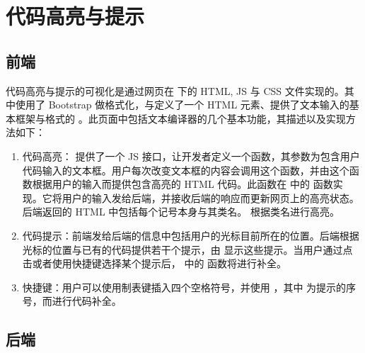 \section{代码高亮与提示}

\subsection{前端}

代码高亮与提示的可视化是通过网页在  下的 HTML, JS 与 CSS 文件实现的。其中使用了 Bootstrap 做格式化，与定义了一个 HTML 元素、提供了文本输入的基本框架与格式的 \href{https://github.com/WebCoder49/code-input}{} 。此页面中包括文本编译器的几个基本功能，其描述以及实现方法如下：

\begin{enumerate}
    \item 代码高亮： 提供了一个 JS 接口，让开发者定义一个函数，其参数为包含用户代码输入的文本框。用户每次改变文本框的内容会调用这个函数，并由这个函数根据用户的输入而提供包含高亮的 HTML 代码。此函数在  中的  函数实现。它将用户的输入发给后端，并接收后端的响应而更新网页上的高亮状态。后端返回的 HTML 中包括每个记号本身与其类名。 根据类名进行高亮。
    \item 代码提示：前端发给后端的信息中包括用户的光标目前所在的位置。后端根据光标的位置与已有的代码提供若干个提示，由  显示这些提示。当用户通过点击或者使用快捷键选择某个提示后， 中的  函数将进行补全。
    \item 快捷键：用户可以使用制表键插入四个空格符号，并使用 ，其中  为提示的序号，而进行代码补全。
\end{enumerate}


\subsection{后端}